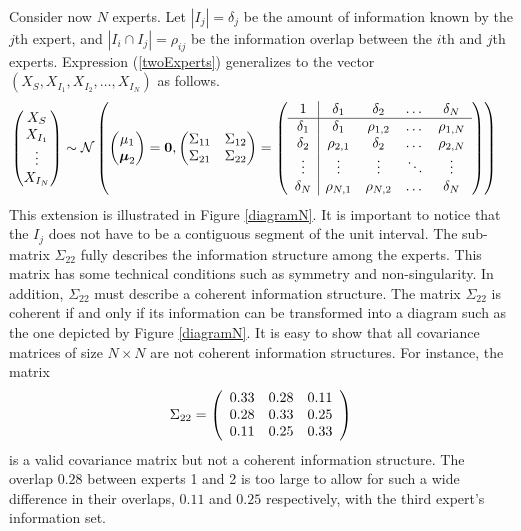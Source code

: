 \documentclass[11pt,twoside]{article}
\begin{document}
Consider now $N$ experts. Let $|I_j| = \delta_j$ be the amount of information known by the $j$th expert, and $|I_i \cap I_j| = \rho_{ij}$ be the information overlap between the $i$th and $j$th experts. Expression (\ref{twoExperts}) generalizes to the vector $(X_{S}, X_{I_1}, X_{I_2}, \dots, X_{I_N})$ as follows.
\begin{align*}
\left(\begin{matrix} X_S \\ X_{I_1}\\ \vdots \\ X_{I_N} \end{matrix}\right) &\sim \mathcal{N}\left( \left(\begin{matrix} 
\mu_1 \\ \boldsymbol{\mu}_2
 \end{matrix}\right) =
 \boldsymbol{0}, \left(\begin{matrix} 
\Sigma_{11} & \Sigma_{12}\\
\Sigma_{21} & \Sigma_{22}\\
 \end{matrix}\right) 
 =
 \left(\begin{array}{c | c c cc }
1 & \delta_1 & \delta_2 & \dots & \delta_N  \\ \hline
\delta_1 & \delta_1 &\rho_{1,2} & \dots & \rho_{1,N}   \\ 
\delta_2 & \rho_{2,1} & \delta_2 & \dots & \rho_{2,N}  \\ 
\vdots & \vdots & \vdots & \ddots & \vdots  \\ 
\delta_N & \rho_{N,1} & \rho_{N,2} & \dots & \delta_N\\ 
 \end{array}\right)\right)
\end{align*}
This extension is illustrated in Figure \ref{diagramN}. It is important to notice that the $I_j$ does not have to be a contiguous segment of the unit interval. The sub-matrix $\Sigma_{22}$ fully describes the information structure among the experts.  This matrix has some technical conditions such as symmetry and non-singularity. In addition, $\Sigma_{22}$ must describe a coherent information structure. The matrix $\Sigma_{22}$ is coherent if and only if its information can be transformed into a diagram such as the one depicted by Figure \ref{diagramN}. It is easy to show that all covariance matrices of size $N \times N$ are not coherent information structures. For instance, the matrix
\begin{align*}
\Sigma_{22} =  \left(\begin{array}{c c c}
0.33 & 0.28 & 0.11\\
0.28 & 0.33 & 0.25\\
0.11 & 0.25 & 0.33\\
 \end{array}\right)
\end{align*}
is a valid covariance matrix but not a coherent information structure. The overlap $0.28$ between experts 1 and 2 is too large to allow for such a wide difference in their overlaps, $0.11$ and $0.25$ respectively, with the third expert's information set. 
\end{document}
